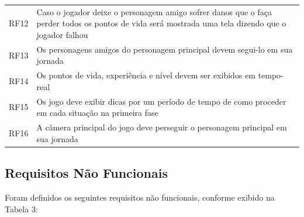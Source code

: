 \begin{table}[h!]
{\begin{tabular}{cp{13cm}}
			RF12 & Caso o jogador deixe o personagem amigo sofrer danos que o faça perder todos os pontos de vida será mostrada uma tela dizendo que o jogador falhou \\
			RF13 & Os personagens amigos do personagem principal devem segui-lo em sua jornada  \\
			RF14 & Os pontos de vida, experiência e nível devem ser exibidos em tempo-real  \\
			RF15 & Os jogo deve exibir dicas por um período de tempo de como proceder em cada situação na primeira fase  \\
			RF16 & A câmera principal do jogo deve perseguir o personagem principal em sua jornada  \\
			
			\bottomrule
		\end{tabular}
	}{
}
\end{table}

\subsection{Requisitos Não Funcionais}
Foram definidos os seguintes requisitos não funcionais, conforme exibido na Tabela 3:
\pagebreak

\begin{table}[h!]	
	\centering
\end{table}


